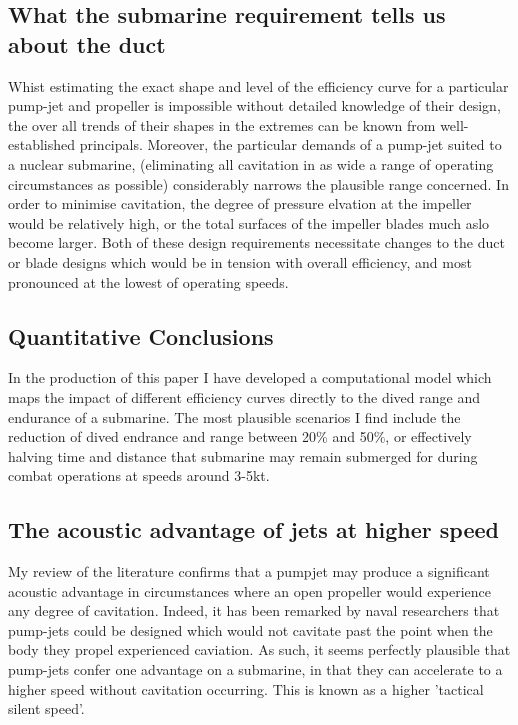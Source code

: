 \documentclass{article}\usepackage[]{graphicx}\usepackage[]{color}
\begin{document}
\subsection{What the submarine requirement tells us about the duct}
Whist estimating the exact shape and level of the efficiency curve for a particular pump-jet and propeller is impossible without detailed knowledge of their design, the over all trends of their shapes in the extremes can be known from well-established principals.  Moreover, the particular demands of a pump-jet suited to a nuclear submarine, (eliminating all cavitation in as wide a range of operating circumstances as possible) considerably narrows the plausible range concerned.  In order to minimise cavitation, the degree of pressure elvation at the impeller would be relatively high, or the total surfaces of the impeller blades much aslo become larger.  Both of these design requirements necessitate changes to the duct or blade designs which would be in tension with overall efficiency, and most pronounced at the lowest of operating speeds.

\subsection{Quantitative Conclusions}
In the production of this paper I have developed a computational model which maps the impact of different efficiency curves directly to the dived range and endurance of a submarine. The most plausible scenarios I find include the reduction of dived endrance and range between 20\% and 50\%, or effectively halving time and distance that submarine may remain submerged for during combat operations at speeds around 3-5kt.

\subsection{The acoustic advantage of jets at higher speed}
My review of the literature confirms that a pumpjet may produce a significant acoustic advantage in circumstances where an open propeller would experience any degree of cavitation. Indeed, it has been remarked by naval researchers that pump-jets could be designed which would not cavitate past the point when the body they propel experienced caviation.   As such, it seems perfectly plausible that pump-jets confer one advantage on a submarine, in that they can accelerate to a higher speed without cavitation occurring.  This is known as a higher 'tactical silent speed'.
\end{document}

